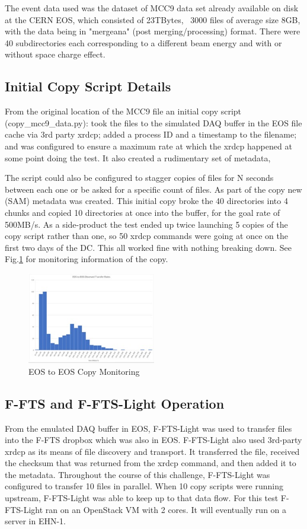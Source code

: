 \documentclass[pdftex,12pt,letter]{article}
\begin{document}
The event data used was the dataset of MCC9 data set already available on disk at the CERN EOS, which consisted of
23TBytes,  ~3000 files of average size 8GB, with the data being in  "mergeana" (post merging/processing)  format. There were 
40 subdirectories each corresponding to a different beam energy and with or without space charge effect.

\subsection{Initial Copy Script Details}
From the original location of the MCC9 file  an initial copy script (copy\_mcc9\_data.py): took the files to the simulated DAQ buffer in the EOS file cache via 3rd party xrdcp; added a process ID and a timestamp to the filename; and was configured to ensure a maximum rate at which the xrdcp happened at some point doing the test. It also created a rudimentary set of metadata,

The script could also be configured to stagger copies of files for N seconds between each one or be asked for a specific  count of files. As part of the copy new (SAM) metadata was created. This initial copy broke the 40 directories into 4 chunks and copied 10 directories at once into the buffer, for the goal rate of 500MB/s. As a side-product the test ended up twice launching 5 copies of the copy script rather than one, so 50 xrdcp commands were going at once on the first two days of the DC. This all worked fine with nothing breaking down. See Fig.\ref{fig:EOStoEOS} for monitoring information of the copy. 


\begin{figure}[tbh]
  \centering
  \includegraphics[width=0.5\textwidth]{./ReportImages/EOStoEOS.jpg}
  \caption{EOS to EOS Copy Monitoring}
  \label{fig:EOStoEOS}
\end{figure}

\subsection{F-FTS and F-FTS-Light Operation}
From the emulated DAQ buffer in EOS, F-FTS-Light was used to transfer files into the F-FTS dropbox which was also in EOS.  F-FTS-Light also used 3rd-party xrdcp as its means of file discovery and transport.  It transferred the file, received the checksum that was returned from the xrdcp command, and then added it to the metadata.  Throughout the course of this challenge, F-FTS-Light was configured to transfer 10 files in parallel.   When 10 copy scripts were running upstream, F-FTS-Light was able to keep up to that data flow.  For this test F-FTS-Light ran on an OpenStack VM with 2 cores.  It will eventually run on a server in EHN-1.
\end{document}
